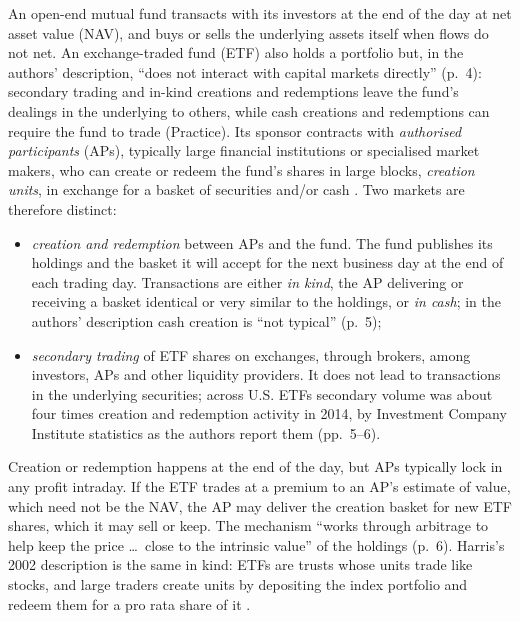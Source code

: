 \begin{qfmechanism}\label{mech:etf-creation-redemption}
 An open-end mutual fund transacts with its investors at the end of the day at net asset value (NAV), and buys or sells the underlying assets itself when flows do not net. An exchange-traded fund (ETF) also holds a portfolio but, in the authors' description, ``does not interact with capital markets directly'' (p.~4): secondary trading and in-kind creations and redemptions leave the fund's dealings in the underlying to others, while cash creations and redemptions can require the fund to trade (Practice). Its sponsor contracts with \emph{authorised participants} (APs), typically large financial institutions or specialised market makers, who can create or redeem the fund's shares in large blocks, \emph{creation units}, in exchange for a basket of securities and/or cash \citep[NBER working paper version, pp.~4--5]{ex-lettau-madhavan-2018}. Two markets are therefore distinct:
\begin{itemize}
\item \emph{creation and redemption} between APs and the fund. The fund publishes its holdings and the basket it will accept for the next business day at the end of each trading day. Transactions are either \emph{in kind}, the AP delivering or receiving a basket identical or very similar to the holdings, or \emph{in cash}; in the authors' description cash creation is ``not typical'' (p.~5);
\item \emph{secondary trading} of ETF shares on exchanges, through brokers, among investors, APs and other liquidity providers. It does not lead to transactions in the underlying securities; across U.S. ETFs secondary volume was about four times creation and redemption activity in 2014, by Investment Company Institute statistics as the authors report them (pp.~5--6).
\end{itemize}
Creation or redemption happens at the end of the day, but APs typically lock in any profit intraday. If the ETF trades at a premium to an AP's estimate of value, which need not be the NAV, the AP may deliver the creation basket for new ETF shares, which it may sell or keep. The mechanism ``works through arbitrage to help keep the price \dots\ close to the intrinsic value'' of the holdings (p.~6). Harris's 2002 description is the same in kind: ETFs are trusts whose units trade like stocks, and large traders create units by depositing the index portfolio and redeem them for a pro rata share of it \citep[chap.~``Index and Portfolio Markets'', sec.~23.5, p.~492]{alpha-harris}.


\end{qfmechanism}
